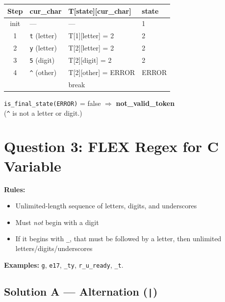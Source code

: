 \documentclass[a4paper,12pt]{article}
\begin{document}
\begin{center}
\renewcommand{\arraystretch}{1.2}
\begin{tabular}{c|l|l|l}
\toprule
\textbf{Step} & \textbf{cur\_char} & \textbf{T[state][cur\_char]} & \textbf{state} \\
\midrule
init  & ---                & ---                       & 1 \\
1     & \texttt{t} (letter) & T[1][letter] = 2         & 2 \\
2     & \texttt{y} (letter) & T[2][letter] = 2         & 2 \\
3     & \texttt{5} (digit)  & T[2][digit] = 2          & 2 \\
4     & \texttt{\^{}} (other) & T[2][other] = ERROR    & ERROR \\
      &                     & break                     & \\
\bottomrule
\end{tabular}
\end{center}
\texttt{is\_final\_state(ERROR)} = false $\Rightarrow$ \textbf{not\_valid\_token}\\
(\texttt{\^{}} is not a letter or digit.)

\newpage
\section{Question 3: FLEX Regex for C Variable}

\noindent\textbf{Rules:}
\begin{itemize}
  \item Unlimited-length sequence of letters, digits, and underscores
  \item Must \emph{not} begin with a digit
  \item If it begins with \texttt{\_}, that must be followed by a letter,
        then unlimited letters/digits/underscores
\end{itemize}

\noindent\textbf{Examples:} \texttt{g},\; \texttt{e17},\; \texttt{\_ty},\;
\texttt{r\_u\_ready},\; \texttt{\_t}.

\subsection{Solution A --- Alternation (\texttt{|})}
\end{document}
